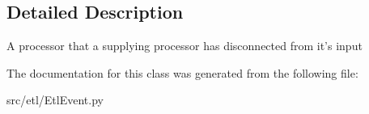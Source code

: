 \subsection{Detailed Description}
\begin{DoxyVerb}A processor that a supplying processor has disconnected from it's input\end{DoxyVerb}
 

The documentation for this class was generated from the following file\-:\begin{DoxyCompactItemize}
\item 
src/etl/Etl\-Event.\-py\end{DoxyCompactItemize}
